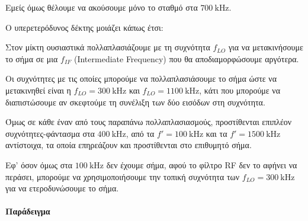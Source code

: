 \documentclass[11pt,a4paper,notitlepage,fleqn,final]{article}
\begin{document}
Εμείς όμως θέλουμε να ακούσουμε μόνο το σταθμό στα \( \SI{700}{\kilo\hertz} \).

Ο υπερετερόδυνος δέκτης μοιάζει κάπως έτσι:


Στον μίκτη ουσιαστικά πολλαπλασιάζουμε με τη συχνότητα \( f_{LO} \) για να μετακινήσουμε
το σήμα σε μια \( f_{IF} \) (Intermediate Frequency) που θα αποδιαμορφώσουμε αργότερα.

Οι συχνότητες με τις οποίες μπορούμε να πολλαπλασιάσουμε το σήμα ώστε να μετακινηθεί είναι
η \( f_{LO} = \SI{300}{\kilo\hertz} \) και \( f_{LO} = \SI{1100}{\kilo\hertz} \), κάτι
που μπορούμε να διαπιστώσουμε αν σκεφτούμε τη συνέλιξη των δύο εισόδων στη συχνότητα.

Όμως σε κάθε έναν από τους παραπάνω πολλαπλασιασμούς, προστίθενται επιπλέον συχνότητες-φάντασμα στα \( \SI{400}{\kilo\hertz} \), από τα \( f' = \SI{100}{\kilo\hertz} \)
και τα \( f' = \SI{1500}{\kilo\hertz} \) αντίστοιχα, τα οποία επηρεάζουν και προστίθενται
στο επιθυμητό σήμα.

Εφ' όσον όμως στα \( \SI{100}{\kilo\hertz} \) δεν έχουμε σήμα, αφού το φίλτρο RF δεν
το αφήνει να περάσει, μπορούμε να χρησιμοποιήσουμε την τοπική συχνότητα των
\( f_{LO} = \SI{300}{\kilo\hertz} \) για να ετεροδυνώσουμε το σήμα.


\paragraph{Παράδειγμα} \hspace{0pt}
\end{document}
